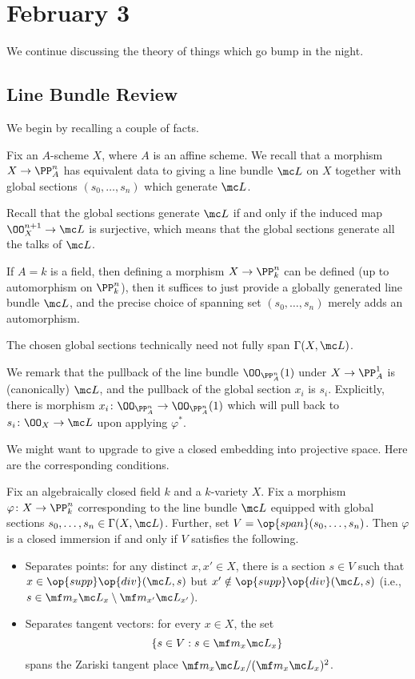 \documentclass[../notes.tex]{subfiles}
\begin{document}
\section{February 3}

We continue discussing the theory of things which go bump in the night.

\subsection{Line Bundle Review}
We begin by recalling a couple of facts.
\begin{proposition} \label{prop:get-proj-morphism}
	Fix an $A$-scheme $X$, where $A$ is an affine scheme. We recall that a morphism $X\to\PP^n_A$ has equivalent data to giving a line bundle $\mc L$ on $X$ together with global sections $(s_0,\ldots,s_n)$ which generate $\mc L$.
\end{proposition}
Recall that the global sections generate $\mc L$ if and only if the induced map $\OO^{n+1}_X\to\mc L$ is surjective, which means that the global sections generate all the talks of $\mc L$.
\begin{remark}
	If $A=k$ is a field, then defining a morphism $X\to\PP^n_k$ can be defined (up to automorphism on $\PP^n_k$), then it suffices to just provide a globally generated line bundle $\mc L$, and the precise choice of spanning set $(s_0,\ldots,s_n)$ merely adds an automorphism.
\end{remark}
\begin{remark}
	The chosen global sections technically need not fully span $\Gamma(X,\mc L)$.
\end{remark}
\begin{remark}
	We remark that the pullback of the line bundle $\OO_{\PP^n_A}(1)$ under $X\to\PP^1_A$ is (canonically) $\mc L$, and the pullback of the global section $x_i$ is $s_i$. Explicitly, there is morphism $x_i\colon\OO_{\PP^n_A}\to\OO_{\PP^n_A}(1)$ which will pull back to $s_i\colon\OO_X\to\mc L$ upon applying $\varphi^*$.
\end{remark}
We might want to upgrade  to give a closed embedding into projective space. Here are the corresponding conditions.
\begin{proposition}
	Fix an algebraically closed field $k$ and a $k$-variety $X$. Fix a morphism $\varphi\colon X\to\PP^n_k$ corresponding to the line bundle $\mc L$ equipped with global sections $s_0,\ldots,s_n\in\Gamma(X,\mc L)$. Further, set $V=\op{span}(s_0,\ldots,s_n)$. Then $\varphi$ is a closed immersion if and only if $V$ satisfies the following.
	\begin{itemize}
		\item Separates points: for any distinct $x,x'\in X$, there is a section $s\in V$ such that $x\in\op{supp}\op{div}(\mc L,s)$ but $x'\notin\op{supp}\op{div}(\mc L,s)$ (i.e., $s\in\mf m_x\mc L_x\setminus\mf m_{x'}\mc L_{x'}$).
		\item Separates tangent vectors: for every $x\in X$, the set
		\[\{s\in V:s\in\mf m_x\mc L_x\}\]
		spans the Zariski tangent place $\mf m_x\mc L_x/(\mf m_x\mc L_x)^2$.
	\end{itemize}
\end{proposition}
\end{document}
